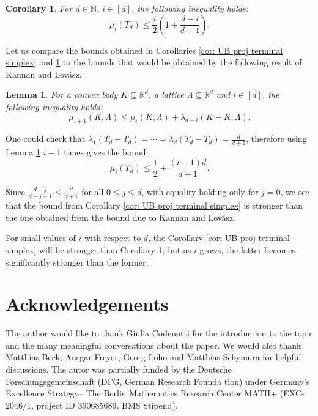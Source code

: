 \documentclass{amsart}
\newtheorem{lemma}[theorem]{Lemma}
\newtheorem{corollary}[theorem]{Corollary}
\theoremstyle{definition}
\theoremstyle{remark}
\newcommand{\R}{\mathbb{R}}
\newcommand{\N}{\mathbb{N}}
\begin{document}
\begin{corollary}\label{cor: UB int terminal simplex}
For $d\in \N$, $i\in [d]$, the following inequality holds:
$$\mu_i(T_d)\leqslant \frac{i}{2}\left(1+\frac{d-i}{d+1}\right).$$
\end{corollary}

Let us compare the bounds obtained in Corollaries \ref{cor: UB proj terminal simplex} and \ref{cor: UB int terminal simplex} to the bounds that would be obtained by the following result of Kannan and Lov\' asz.

\begin{lemma}\cite{KannanLovasz}\label{KL lem 2.5}
For a convex body $K\subseteq \R^d$, a lattice $\Lambda \subseteq \R^d$ and $i\in [d]$, the following inequality holds:
$$\mu_{i+1}(K,\Lambda)\leqslant \mu_i(K,\Lambda)+\lambda_{d-i}(K-K, \Lambda).$$
\end{lemma}

One could check that $\lambda_1(T_d-T_d)=\cdots=\lambda_d(T_d-T_d)=\frac{d}{d+1}$, therefore using Lemma \ref{KL lem 2.5} $i-1$ times gives the bound:
$$\mu_i(T_d)\leqslant \frac{1}{2}+\frac{(i-1)d}{d+1}.$$

Since $\frac{d-j}{d-j+1}\leqslant\frac{d}{d+1}$ for all $0\leqslant j \leqslant d$, with equality holding only for $j=0$, we see that the bound from Corollary \ref{cor: UB proj terminal simplex} is stronger than the one obtained from the bound due to Kannan and Lov\'asz.

For small values of $i$ with respect to $d$, the Corollary  \ref{cor: UB proj terminal simplex} will be stronger than Corollary  \ref{cor: UB int terminal simplex}, but as $i$ grows, the latter becomes significantly stronger than the former. 
\section*{Acknowledgements}

The author would like to thank Giulia Codenotti for the introduction to the topic and the many meaningful conversations about the paper. We would also thank Matthias Beck, Ansgar Freyer, Georg Loho and Matthias Schymura for helpful discussions. The autor was partially funded by the Deutsche Forschungsgemeinschaft (DFG, German Research Founda
tion) under Germany’s Excellence Strategy– The Berlin Mathematics Research Center MATH+ (EXC-2046/1, project
ID 390685689, BMS Stipend).



\end{document}
